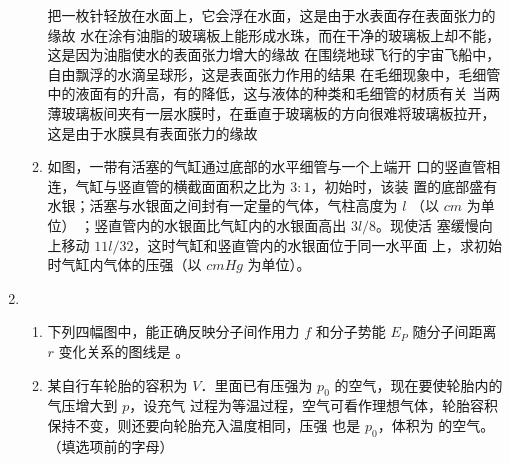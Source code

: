 \begin{enumerate}
\begin{enumerate}
\fivechoices
{把一枚针轻放在水面上，它会浮在水面，这是由于水表面存在表面张力的缘故}
{水在涂有油脂的玻璃板上能形成水珠，而在干净的玻璃板上却不能，这是因为油脂使水的表面张力增大的缘故}
{在围绕地球飞行的宇宙飞船中，自由飘浮的水滴呈球形，这是表面张力作用的结果}
{在毛细现象中，毛细管中的液面有的升高，有的降低，这与液体的种类和毛细管的材质有关}
{当两薄玻璃板间夹有一层水膜时，在垂直于玻璃板的方向很难将玻璃板拉开，这是由于水膜具有表面张力的缘故}




\item 
如图，一带有活塞的气缸通过底部的水平细管与一个上端开
口的竖直管相连，气缸与竖直管的横截面面积之比为 $ 3 : 1 $，初始时，该装
置的底部盛有水银；活塞与水银面之间封有一定量的气体，气柱高度为 $ l $
（以 $ cm $ 为单位）
；竖直管内的水银面比气缸内的水银面高出 $ 3l/8 $。现使活
塞缓慢向上移动 $ 11l/32 $，这时气缸和竖直管内的水银面位于同一水平面
上，求初始时气缸内气体的压强（以 $ cmHg $ 为单位）。
\begin{figure}[h!]
	\flushright
	
\end{figure}




	
\end{enumerate}

\item 
{}
\begin{enumerate}
	\item
下列四幅图中，能正确反映分子间作用力 $ f $ 和分子势能 $ E_{P} $ 随分子间距离 $ r $ 变化关系的图线是 \underlinegap 。
\pfourchoices
{}
{}
{}
{}



\item 
某自行车轮胎的容积为 $ V $．里面已有压强为 $ p_{0} $ 的空气，现在要使轮胎内的气压增大到 $ p $，设充气
过程为等温过程，空气可看作理想气体，轮胎容积保持不变，则还要向轮胎充入温度相同，压强
也是 $ p_{0} $，体积为
 \underlinegap 
的空气。（填选项前的字母）


\end{enumerate}
\end{enumerate}
